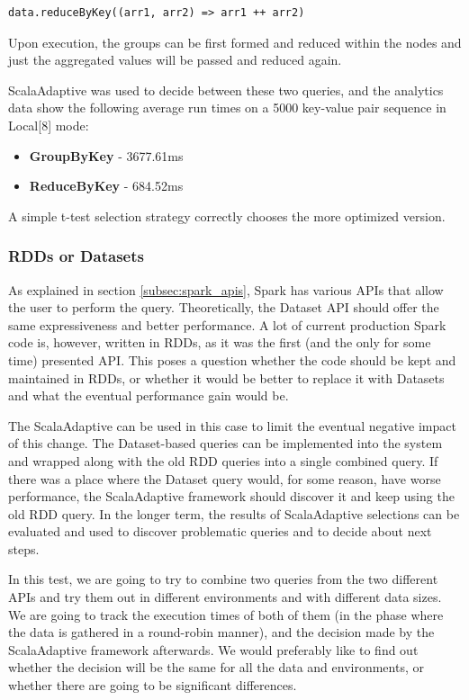 \lstset{style=Scala}
\begin{lstlisting}
data.reduceByKey((arr1, arr2) => arr1 ++ arr2)
\end{lstlisting}

Upon execution, the groups can be first formed and reduced within the nodes and just the aggregated values will be passed and reduced again.

ScalaAdaptive was used to decide between these two queries, and the analytics data show the following average run times on a 5000 key-value pair sequence in Local[8] mode:
\begin{itemize}
	\item \textbf{GroupByKey} - 3677.61ms
	\item \textbf{ReduceByKey} - 684.52ms
\end{itemize}

A simple t-test selection strategy correctly chooses the more optimized version.

\subsubsection{RDDs or Datasets}

As explained in section \ref{subsec:spark_apis}, Spark has various APIs that allow the user to perform the query. Theoretically, the Dataset API should offer the same expressiveness and better performance. A lot of current production Spark code is, however, written in RDDs, as it was the first (and the only for some time) presented API. This poses a question whether the code should be kept and maintained in RDDs, or whether it would be better to replace it with Datasets and what the eventual performance gain would be.

The ScalaAdaptive can be used in this case to limit the eventual negative impact of this change. The Dataset-based queries can be implemented into the system and wrapped along with the old RDD queries into a single combined query. If there was a place where the Dataset query would, for some reason, have worse performance, the ScalaAdaptive framework should discover it and keep using the old RDD query. In the longer term, the results of ScalaAdaptive selections can be evaluated and used to discover problematic queries and to decide about next steps.

In this test, we are going to try to combine two queries from the two different APIs and try them out in different environments and with different data sizes. We are going to track the execution times of both of them (in the phase where the data is gathered in a round-robin manner), and the decision made by the ScalaAdaptive framework afterwards. We would preferably like to find out whether the decision will be the same for all the data and environments, or whether there are going to be significant differences.

